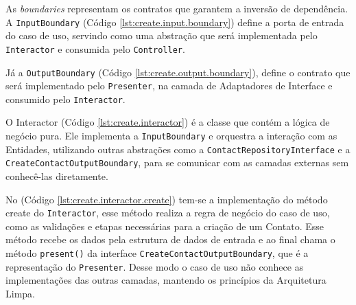     \par As \textit{boundaries} representam os contratos que garantem a inversão de dependência. A \texttt{InputBoundary} (Código \ref{lst:create.input.boundary}) define a porta de entrada do caso de uso, servindo como uma abstração que será implementada pelo \texttt{Interactor} e consumida pelo \texttt{Controller}.
        
    
        
    \par Já a \texttt{OutputBoundary} (Código \ref{lst:create.output.boundary}), define o contrato que será implementado pelo \texttt{Presenter}, na camada de Adaptadores de Interface e consumido pelo \texttt{Interactor}.
        
    
        
        
    \par O Interactor (Código \ref{lst:create.interactor}) é a classe que contém a lógica de negócio pura. Ele implementa a \texttt{InputBoundary} e orquestra a interação com as Entidades, utilizando outras abstrações como a \texttt{ContactRepositoryInterface} e a \texttt{CreateContactOutputBoundary}, para se comunicar com as camadas externas sem conhecê-las diretamente.
        
    

    \par No (Código \ref{lst:create.interactor.create}) tem-se a implementação do método create do \texttt{Interactor}, esse método realiza a regra de negócio do caso de uso, como as validações e etapas necessárias para a criação de um Contato. Esse método recebe os dados pela estrutura de dados de entrada e ao final chama o método \texttt{present()} da interface \texttt{CreateContactOutputBoundary}, que é a representação do \texttt{Presenter}. Desse modo o caso de uso não conhece as implementações das outras camadas, mantendo os princípios da Arquitetura Limpa.

